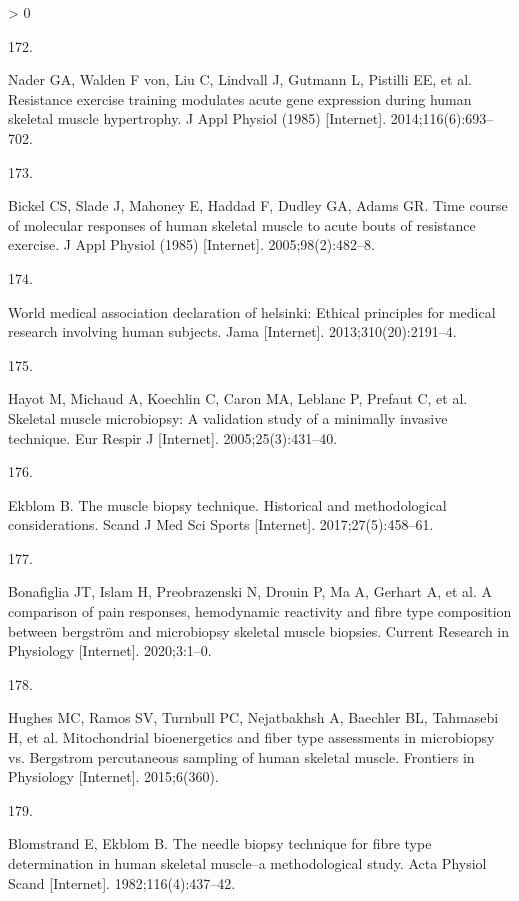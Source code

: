 \documentclass[twoside,10pt]{gihclass} %
\newlength{\cslhangindent}
\newlength{\csllabelwidth}
\newenvironment{CSLReferences}[3] %
 {%
  \setlength{\parindent}{0pt}
  \ifodd #1 \everypar{\setlength{\hangindent}{\cslhangindent}}\ignorespaces\fi
  \ifnum #2 > 0
  \setlength{\parskip}{#2\baselineskip}
  \fi
 }%
 {}
\newcommand{\CSLLeftMargin}[1]{\parbox[t]{\maxof{\widthof{#1}}{\csllabelwidth}}{#1}}
\newcommand{\CSLRightInline}[1]{\parbox[t]{\linewidth}{#1}}
\begin{document}
\begin{CSLReferences}{0}{0}
\leavevmode\hypertarget{ref-RN1037}{}%
\CSLLeftMargin{172. }
\CSLRightInline{Nader GA, Walden F von, Liu C, Lindvall J, Gutmann L, Pistilli EE, et al. Resistance exercise training modulates acute gene expression during human skeletal muscle hypertrophy. J Appl Physiol (1985) {[}Internet{]}. 2014;116(6):693--702. }

\leavevmode\hypertarget{ref-RN1520}{}%
\CSLLeftMargin{173. }
\CSLRightInline{Bickel CS, Slade J, Mahoney E, Haddad F, Dudley GA, Adams GR. Time course of molecular responses of human skeletal muscle to acute bouts of resistance exercise. J Appl Physiol (1985) {[}Internet{]}. 2005;98(2):482--8. }

\leavevmode\hypertarget{ref-RN2548}{}%
\CSLLeftMargin{174. }
\CSLRightInline{World medical association declaration of helsinki: Ethical principles for medical research involving human subjects. Jama {[}Internet{]}. 2013;310(20):2191--4. }

\leavevmode\hypertarget{ref-RN824}{}%
\CSLLeftMargin{175. }
\CSLRightInline{Hayot M, Michaud A, Koechlin C, Caron MA, Leblanc P, Prefaut C, et al. Skeletal muscle microbiopsy: A validation study of a minimally invasive technique. Eur Respir J {[}Internet{]}. 2005;25(3):431--40. }

\leavevmode\hypertarget{ref-RN2549}{}%
\CSLLeftMargin{176. }
\CSLRightInline{Ekblom B. The muscle biopsy technique. Historical and methodological considerations. Scand J Med Sci Sports {[}Internet{]}. 2017;27(5):458--61. }

\leavevmode\hypertarget{ref-RN2553}{}%
\CSLLeftMargin{177. }
\CSLRightInline{Bonafiglia JT, Islam H, Preobrazenski N, Drouin P, Ma A, Gerhart A, et al. A comparison of pain responses, hemodynamic reactivity and fibre type composition between bergström and microbiopsy skeletal muscle biopsies. Current Research in Physiology {[}Internet{]}. 2020;3:1--0. }

\leavevmode\hypertarget{ref-RN2552}{}%
\CSLLeftMargin{178. }
\CSLRightInline{Hughes MC, Ramos SV, Turnbull PC, Nejatbakhsh A, Baechler BL, Tahmasebi H, et al. Mitochondrial bioenergetics and fiber type assessments in microbiopsy vs. Bergstrom percutaneous sampling of human skeletal muscle. Frontiers in Physiology {[}Internet{]}. 2015;6(360). }

\leavevmode\hypertarget{ref-RN874}{}%
\CSLLeftMargin{179. }
\CSLRightInline{Blomstrand E, Ekblom B. The needle biopsy technique for fibre type determination in human skeletal muscle--a methodological study. Acta Physiol Scand {[}Internet{]}. 1982;116(4):437--42. }


\end{CSLReferences}
\end{document}
